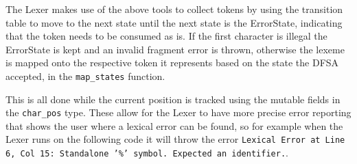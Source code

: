\documentclass[11pt, a4paper]{article}
\begin{document}
\begin{figure}[H]
{
    }
\end{figure}

\medskip

The Lexer makes use of the above tools to collect tokens by using the transition table to move
to the next state until the next state is the ErrorState, indicating that the token needs to be consumed
as is. If the first character is illegal the ErrorState is kept and an invalid fragment error is thrown, 
otherwise the lexeme is mapped onto the respective token it represents based on the state the DFSA accepted, 
in the \texttt{map\_states} function.

\medskip

This is all done while the current position is tracked using the mutable fields in the \texttt{char\_pos} type. 
These allow for the Lexer to have more precise error reporting that shows the user where a lexical error can be found, 
so for example when the Lexer runs on the following code it will throw the error 
\texttt{Lexical Error at Line 6, Col 15: Standalone '\%' symbol. Expected an identifier.}.

\medskip
\end{document}
